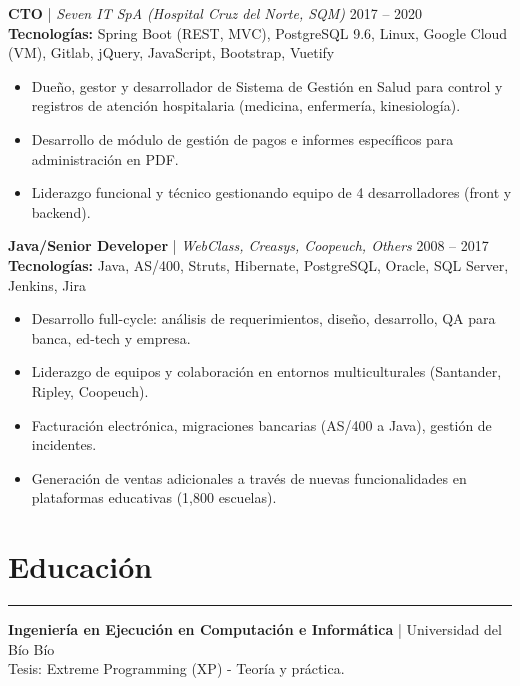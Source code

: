 \documentclass[11pt,a4paper]{article}
\begin{document}
\vspace{8pt}
\textbf{CTO} | \textit{Seven IT SpA (Hospital Cruz del Norte, SQM)} \hfill 2017 -- 2020 \\
\textbf{Tecnologías:} Spring Boot (REST, MVC), PostgreSQL 9.6, Linux, Google Cloud (VM), Gitlab, jQuery, JavaScript, Bootstrap, Vuetify \\
\begin{itemize}[noitemsep, topsep=0pt]
    \item Dueño, gestor y desarrollador de Sistema de Gestión en Salud para control y registros de atención hospitalaria (medicina, enfermería, kinesiología).
    \item Desarrollo de módulo de gestión de pagos e informes específicos para administración en PDF.
    \item Liderazgo funcional y técnico gestionando equipo de 4 desarrolladores (front y backend).
\end{itemize}
\vspace{8pt}
\textbf{Java/Senior Developer} | \textit{WebClass, Creasys, Coopeuch, Others} \hfill 2008 -- 2017 \\
\textbf{Tecnologías:} Java, AS/400, Struts, Hibernate, PostgreSQL, Oracle, SQL Server, Jenkins, Jira \\
\begin{itemize}[noitemsep, topsep=0pt]
    \item Desarrollo full-cycle: análisis de requerimientos, diseño, desarrollo, QA para banca, ed-tech y empresa.
    \item Liderazgo de equipos y colaboración en entornos multiculturales (Santander, Ripley, Coopeuch).
    \item Facturación electrónica, migraciones bancarias (AS/400 a Java), gestión de incidentes.
    \item Generación de ventas adicionales a través de nuevas funcionalidades en plataformas educativas (1,800 escuelas).
\end{itemize}

\section*{Educación}
\hrule
\vspace{5pt}
\textbf{Ingeniería en Ejecución en Computación e Informática} | Universidad del Bío Bío \\
Tesis: Extreme Programming (XP) - Teoría y práctica.
\end{document}
